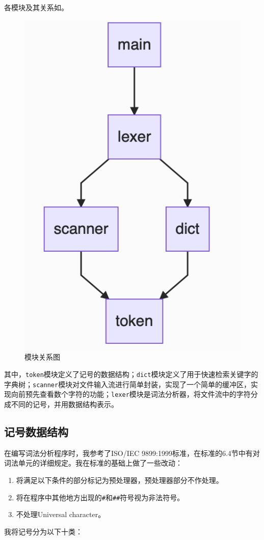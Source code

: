 \documentclass[lang=cn,11pt,a4paper,cite=authornum]{paper}
\begin{document}
各模块及其关系如。

\begin{figure}[htbp]

    \centering
    \includegraphics[width=0.25\linewidth]{./images/structure.png}
    \caption{模块关系图\label{fig:structure}}

\end{figure}

其中，\texttt{token}模块定义了记号的数据结构；\texttt{dict}模块定义了用于快速检索关键字的字典树；\texttt{scanner}模块对文件输入流进行简单封装，实现了一个简单的缓冲区，实现向前预先查看数个字符的功能；\texttt{lexer}模块是词法分析器，将文件流中的字符分成不同的记号，并用数据结构表示。

\subsection{记号数据结构}

在编写词法分析程序时，我参考了ISO/IEC 9899:1999标准，在标准的6.4节中有对词法单元的详细规定。我在标准的基础上做了一些改动：

\begin{enumerate}
    \item 将满足以下条件的部分标记为预处理器，预处理器部分不作处理。
          \begin{itemize}
              \item 以\texttt{#}开头，且此符号在行首或者此符号前都是空白字符。
              \item 以换行结束，除非忽略本行末尾的空白字符后本行末尾的最后一个字符为\texttt{\}。
          \end{itemize}
    \item 将在程序中其他地方出现的\texttt{#}和\texttt{##}符号视为非法符号。
    \item 不处理Universal character。
\end{enumerate}

我将记号分为以下十类：
\end{document}

